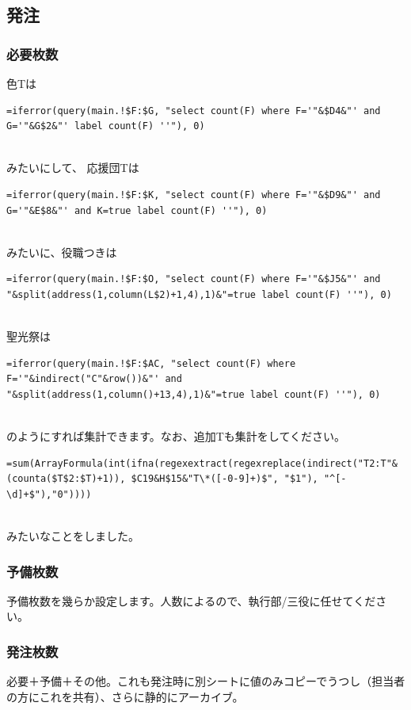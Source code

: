 \documentclass[dvipdfmx,jb5]{jreport}
\begin{document}
\subsection{発注}
\subsubsection{必要枚数}
色Tは
\\
\begin{lstlisting}
=iferror(query(main.!$F:$G, "select count(F) where F='"&$D4&"' and G='"&G$2&"' label count(F) ''"), 0)
\end{lstlisting}
\\
みたいにして、
応援団Tは
\\
\begin{lstlisting}
=iferror(query(main.!$F:$K, "select count(F) where F='"&$D9&"' and G='"&E$8&"' and K=true label count(F) ''"), 0)
\end{lstlisting}
\\
みたいに、役職つきは
\\
\begin{lstlisting}
=iferror(query(main.!$F:$O, "select count(F) where F='"&$J5&"' and "&split(address(1,column(L$2)+1,4),1)&"=true label count(F) ''"), 0)
\end{lstlisting}
\\
聖光祭は
\\
\begin{lstlisting}
=iferror(query(main.!$F:$AC, "select count(F) where F='"&indirect("C"&row())&"' and "&split(address(1,column()+13,4),1)&"=true label count(F) ''"), 0)
\end{lstlisting}
\\
のようにすれば集計できます。なお、追加Tも集計をしてください。
\\
\begin{lstlisting}
=sum(ArrayFormula(int(ifna(regexextract(regexreplace(indirect("T2:T"&(counta($T$2:$T)+1)), $C19&H$15&"T\*([-0-9]+)$", "$1"), "^[-\d]+$"),"0"))))
\end{lstlisting}
\\
みたいなことをしました。

\subsubsection{予備枚数}
予備枚数を幾らか設定します。人数によるので、執行部/三役に任せてください。

\subsubsection{発注枚数}
必要＋予備＋その他。これも発注時に別シートに値のみコピーでうつし（担当者の方にこれを共有）、さらに静的にアーカイブ。
\end{document}
